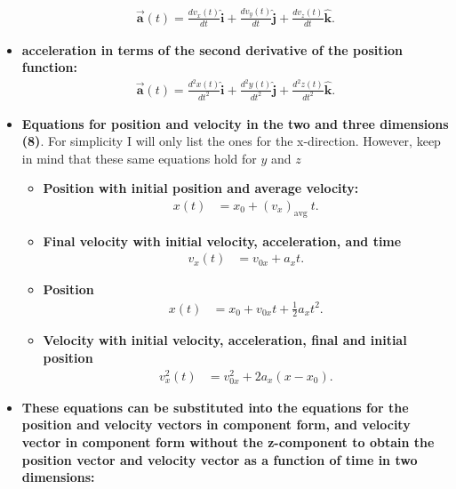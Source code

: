 \documentclass{report}
\begin{document}
\begin{itemize}
            \begin{align*}
                \vec{\mathbf{a}}(t) = \frac{dv_{x}(t)}{dt}\hat{\mathbf{i}} + \frac{dv_{y}(t)}{dt}\hat{\mathbf{j}} + \frac{dv_{z}(t)}{dt}\hat{\mathbf{k}}
            .\end{align*}
        \item \textbf{acceleration in terms of the second derivative of the position function:}
            \begin{align*}
                \vec{\mathbf{a}}(t) = \frac{d^{2}x(t)}{dt^{2}}\hat{\mathbf{i}} + \frac{d^{2}y(t)}{dt^{2}}\hat{\mathbf{j}} + \frac{d^{2}z(t)}{dt^{2}}\hat{\mathbf{k}}
            .\end{align*}
        \item \textbf{Equations for position and velocity in the two and three dimensions (8)}. For simplicity I will only list the ones for the x-direction. However, keep in mind that these same equations hold for $y$ and $z$
            \begin{itemize}
                \item \textbf{Position with initial position and average velocity:} 
                    \begin{align*}
                        x(t)&=x_0+\left(v_x\right)_{\text {avg }} t
                    .\end{align*}
                \item \textbf{Final velocity with initial velocity, acceleration, and time}
                    \begin{align*}
                        v_x(t)&=v_{0 x}+a_x t
                    .\end{align*}
                \item \textbf{Position}
                    \begin{align*}
                        x(t)&=x_0+v_{0 x} t+\frac{1}{2} a_x t^2
                    .\end{align*}
                \item \textbf{Velocity with initial velocity, acceleration, final and initial position}
                    \begin{align*}
                        v_x^2(t)&=v_{0 x}^2+2 a_x\left(x-x_0\right) 
                    .\end{align*}
            \end{itemize}
        \item \textbf{These equations can be substituted into the equations for the position and velocity vectors in component form, and velocity vector in component form without the z-component to obtain the position vector and velocity vector as a function of time in two dimensions:}

\end{itemize}
\end{document}
